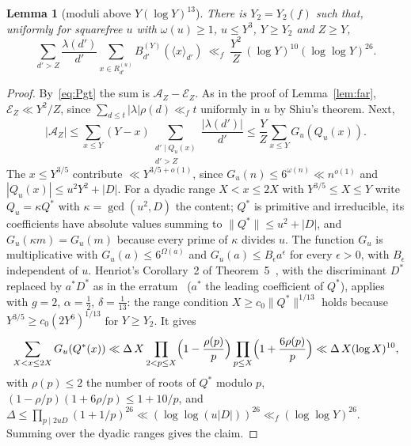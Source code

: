 \documentclass[11pt,a4paper]{article}
\newtheorem{lemma}[theorem]{Lemma}
\theoremstyle{remark}\newtheorem{remark}[theorem]{Remark}
\newcommand{\rep}[2]{\langle #1\rangle_{#2}}
\begin{document}
\begin{lemma}[moduli above $Y(\log Y)^{13}$]\label{lem:tail}
There is $Y_2=Y_2(f)$ such that, uniformly for squarefree $u$ with $\omega(u)\ge1$, $u\le Y^3$, $Y\ge Y_2$ and $Z\ge Y$,
\[
\sum_{d'>Z}\frac{\lambda(d')}{d'}\sum_{x\in R^{(u)}_{d'}}B^{(Y)}_{d'}(\rep x{d'})\ \ll_f\ \frac{Y^2}{Z}\,(\log Y)^{10}(\log\log Y)^{26}.
\]
\end{lemma}
\begin{proof}
By~\eqref{eq:Pgt} the sum is $\mathcal A_Z-\mathcal E_Z$. As in the proof of Lemma~\ref{lem:far}, $\mathcal E_Z\ll Y^2/Z$, since
$\sum_{d\le t}|\lambda|\rho(d)\ll_ft$ uniformly in $u$ by Shiu's theorem. Next,
\[
|\mathcal A_Z|\le\sum_{x\le Y}(Y-x)\sum_{\substack{d'\mid Q_u(x)\\ d'>Z}}\frac{|\lambda(d')|}{d'}\le\frac YZ\sum_{x\le Y}G_u(Q_u(x)).
\]
The $x\le Y^{3/5}$ contribute $\ll Y^{3/5+o(1)}$, since $G_u(n)\le6^{\omega(n)}\ll n^{o(1)}$ and $|Q_u(x)|\le u^2Y^2+|D|$. For a dyadic
range $X<x\le2X$ with $Y^{3/5}\le X\le Y$ write $Q_u=\kappa Q^\ast$ with $\kappa=\gcd(u^2,D)$ the content; $Q^\ast$ is primitive and
irreducible, its coefficients have absolute values summing to $\|Q^\ast\|\le u^2+|D|$, and $G_u(\kappa m)=G_u(m)$ because every
prime of $\kappa$ divides $u$. The function $G_u$ is multiplicative with $G_u(a)\le6^{\Omega(a)}$ and $G_u(a)\le B_\epsilon a^\epsilon$
for every $\epsilon>0$, with $B_\epsilon$ independent of $u$. Henriot's Corollary~2 of Theorem~5~\cite{Henriot2012}, with the
discriminant $D^\ast$ replaced by $a^\ast D^\ast$ as in the erratum~\cite{Henriot2014} ($a^\ast$ the leading coefficient of $Q^\ast$),
applies with $g=2$, $\alpha=\tfrac12$, $\delta=\tfrac1{13}$: the range condition $X\ge c_0\|Q^\ast\|^{1/13}$ holds because
$Y^{3/5}\ge c_0(2Y^6)^{1/13}$ for $Y\ge Y_2$. It gives
\[
\sum_{X<x\le2X}G_u(Q^\ast(x))\ll\Delta\,X\prod_{2<p\le X}\Bigl(1-\frac{\rho(p)}p\Bigr)\prod_{p\le X}\Bigl(1+\frac{6\rho(p)}p\Bigr)\ll\Delta\,X(\log X)^{10},
\]
with $\rho(p)\le2$ the number of roots of $Q^\ast$ modulo $p$, $(1-\rho/p)(1+6\rho/p)\le1+10/p$, and
$\Delta\le\prod_{p\mid 2uD}(1+1/p)^{26}\ll(\log\log(u|D|))^{26}\ll_f(\log\log Y)^{26}$. Summing over the dyadic ranges gives the claim.
\end{proof}
\end{document}
